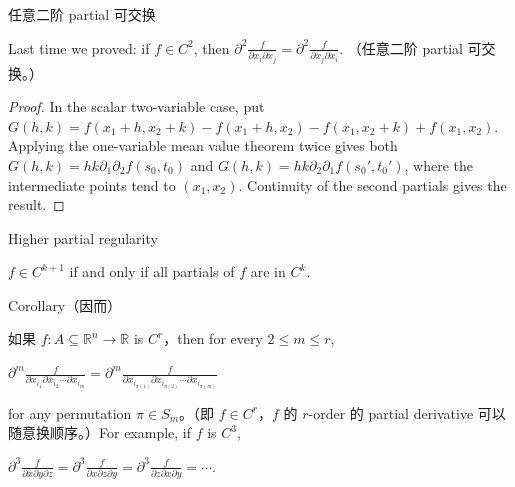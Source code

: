 \begin{theorem}{任意二阶 partial 可交换}

Last time we proved: if \(f \in C^{2}\), then \(\partial^{2}\frac{f}{\partial x_{i}\partial x_{j}} = \partial^{2}\frac{f}{\partial x_{j}\partial x_{i}}\). （任意二阶 partial 可交换。）

\end{theorem}

\begin{proof}

In the scalar two-variable case, put \(G\left( {h,k} \right) = f\left( {x_{1} + h,x_{2} + k} \right) - f\left( {x_{1} + h,x_{2}} \right) - f\left( {x_{1},x_{2} + k} \right) + f\left( {x_{1},x_{2}} \right)\). Applying the one-variable mean value theorem twice gives both \(G\left( {h,k} \right) = hk\partial_{1}\partial_{2}f\left( {s_{0},t_{0}} \right)\) and \(G\left( {h,k} \right) = hk\partial_{2}\partial_{1}f\left( {s_{0}',t_{0}'} \right)\), where the intermediate points tend to \(\left( {x_{1},x_{2}} \right)\). Continuity of the second partials gives the result.

\end{proof}

\begin{theorem}{Higher partial regularity}

\(f \in C^{k + 1}\) if and only if all partials of \(f\) are in \(C^{k}\).

\end{theorem}

\begin{theorem}{Corollary（因而）}

如果 \(f:A \subseteq \mathbb{R}^{n}\rightarrow\mathbb{R}\) is \(C^{r}\)，then for every \(2 \leq m \leq r\),

\(\partial^{m}\frac{f}{\partial x_{i_{1}}\partial x_{i_{2}}\cdots\partial x_{i_{m}}} = \partial^{m}\frac{f}{\partial x_{i_{\pi{(1)}}}\partial x_{i_{\pi{(2)}}}\cdots\partial x_{i_{\pi{(m)}}}}\)

for any permutation \(\pi \in S_{m}\)。（即 \(f \in C^{r}\)，\(f\) 的 \(r\)-order 的 partial derivative 可以随意换顺序。）For example, if \(f\) is \(C^{3}\),

\(\partial^{3}\frac{f}{\partial x\partial y\partial z} = \partial^{3}\frac{f}{\partial x\partial z\partial y} = \partial^{3}\frac{f}{\partial z\partial x\partial y} = \cdots\).

\end{theorem}

